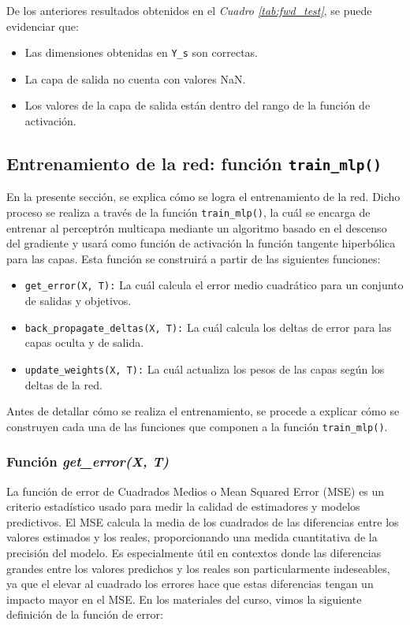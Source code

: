 \documentclass{article}
\begin{document}
\noindent
De los anteriores resultados obtenidos en el \textit{Cuadro \ref{tab:fwd_test}}, se puede evidenciar que:

\begin{itemize}
    \item Las dimensiones obtenidas en \texttt{Y\_s} son correctas.
    \item La capa de salida no cuenta con valores NaN.
    \item Los valores de la capa de salida están dentro del rango de la función de activación.
\end{itemize}

\subsection{Entrenamiento de la red: función \texttt{train\_mlp()}}

En la presente sección, se explica cómo se logra el entrenamiento de la red. Dicho proceso se realiza a través de la función \texttt{train\_mlp()}, la cuál se encarga de entrenar al perceptrón multicapa mediante un algoritmo basado en el descenso del gradiente y usará como función de activación la función tangente hiperbólica para las capas. Esta función se construirá a partir de las siguientes funciones:

\begin{itemize}
    \item \texttt{get\_error(X, T):} La cuál calcula el error medio cuadrático para un conjunto de salidas y objetivos.
    
    \item \texttt{back\_propagate\_deltas(X, T):} La cuál calcula los deltas de error para las capas oculta y de salida.

    \item \texttt{update\_weights(X, T):} La cuál actualiza los pesos de las capas según los deltas de la red.
\end{itemize}

\noindent
Antes de detallar cómo se realiza el entrenamiento, se procede a explicar cómo se construyen cada una de las funciones que componen a la función \texttt{train\_mlp()}.

\subsubsection{Función \textit{get\_error(X, T)}}

La función de error de Cuadrados Medios o Mean Squared Error (MSE) es un criterio estadístico usado para medir la calidad de estimadores y modelos predictivos. El MSE calcula la media de los cuadrados de las diferencias entre los valores estimados y los reales, proporcionando una medida cuantitativa de la precisión del modelo. Es especialmente útil en contextos donde las diferencias grandes entre los valores predichos y los reales son particularmente indeseables, ya que el elevar al cuadrado los errores hace que estas diferencias tengan un impacto mayor en el MSE. En los materiales del curso, vimos la siguiente definición de la función de error:
\end{document}

